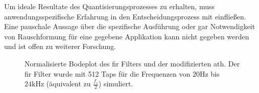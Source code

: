 Um ideale Resultate des Quantisierungsprozesses zu erhalten, muss anwendungsspezifische Erfahrung in den Entscheidungsprozess mit einfließen.
Eine pauschale Aussage über die spezifische Ausführung oder gar Notwendigkeit von Rauschformung für eine gegebene Applikation kann nicht gegeben werden und ist offen zu weiterer Forschung.

\begin{figure}[h]
    \centering
    \caption[Normalisierte Bodeplot des Filters]{Normalisierte Bodeplot des \gls{fir} Filters und der modifizierten \gls{ath}. Der \gls{fir} Filter wurde mit 512 Taps für die Frequenzen von $20\text{Hz}$ bis $24\text{kHz}$ (äquivalent zu $\frac{f_s}{2}$) simuliert.}
    \label{fig:frequency}
\end{figure}
